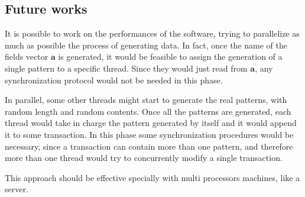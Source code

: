 \documentclass{acm_proc_article-sp-sigmod09}
\begin{document}
\subsection{Future works}
It is possible to work on the performances of the software, trying to parallelize as much as possible the process of generating data. In fact, once the name of the fields vector $\boldsymbol{a}$ is generated, it would be feasible to assign the generation of a single pattern to a specific thread. Since they would just read from $\boldsymbol{a}$, any synchronization protocol would not be needed in this phase.

In parallel, some other threads might start to generate the real patterns, with random length and random contents. Once all the patterns are generated, each thread would take in charge the pattern generated by itself and it would append it to some transaction. In this phase some synchronization procedures would be necessary, since a transaction can contain more than one pattern, and therefore more than one thread would try to concurrently modify a single transaction.

This approach should be effective specially with multi processors machines, like a server.



\end{document}
